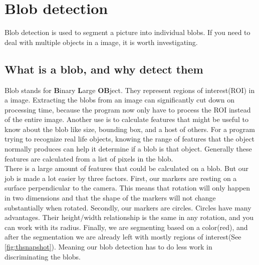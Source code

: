 \section{Blob detection}
Blob detection is used to segment a picture into individual blobs. If you need to deal with multiple objects in a image, it is worth investigating. 
\subsection{What is a blob, and why detect them}
Blob stands for \textbf{B}inary \textbf{L}arge \textbf{OB}ject. They represent regions of interest(ROI) in a image. Extracting the blobs from an image can significantly cut down on processing time, because the program now only have to process the ROI instead of the entire image. Another use is to calculate features that might be useful to know about the blob like size, bounding box, and a host of others. For a program trying to recognize real life objects, knowing the range of features that the object normally produces can help it determine if a blob is that object. Generally these features are calculated from a list of pixels in the blob.\\

There is a large amount of features that could be calculated on a blob. But our job is made a lot easier by three factors. First, our markers are resting on a surface perpendicular to the camera. This means that rotation will only happen in two dimensions and that the shape of the markers will not change substantially when rotated. Secondly, our markers are circles. Circles have many advantages. Their height/width relationship is the same in any rotation, and you can work with its radius. Finally, we are segmenting based on a color(red), and after the segmentation we are already left with mostly regions of interest(See \autoref{fig:thsnapshot}). Meaning our blob detection has to do less work in discriminating the blobs.
